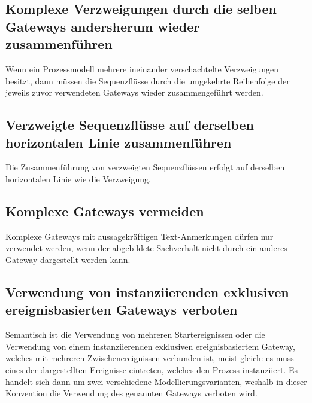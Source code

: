 \documentclass[12pt,report]{snetTeaching}
\begin{document}
\subsection{Komplexe Verzweigungen durch die selben Gateways andersherum wieder zusammenführen}
\label{sec:gwGleichSchliessen}

Wenn ein Prozessmodell mehrere ineinander verschachtelte Verzweigungen besitzt, dann müssen die Sequenzflüsse durch die umgekehrte Reihenfolge der jeweils zuvor verwendeten Gateways wieder zusammengeführt werden.


\begin{Rahmen}
	\hfill
\end{Rahmen}


\clearpage
\subsection{Verzweigte Sequenzflüsse auf derselben horizontalen Linie zusammenführen}

Die Zusammenführung von verzweigten Sequenzflüssen erfolgt auf derselben horizontalen Linie wie die Verzweigung.


\begin{Rahmen}
	\hfill
\end{Rahmen}



\subsection{Komplexe Gateways vermeiden}

Komplexe Gateways mit aussagekräftigen Text-Anmerkungen dürfen nur verwendet werden, wenn der abgebildete Sachverhalt nicht durch ein anderes Gateway dargestellt werden kann.

\begin{Rahmen}
	\hfill
\end{Rahmen}


\clearpage
\subsection{Verwendung von instanziierenden exklusiven ereignisbasierten Gateways verboten}

Semantisch ist die Verwendung von mehreren Startereignissen oder die Verwendung von einem instanziierenden exklusiven ereignisbasiertem Gateway, welches mit mehreren Zwischenereignissen verbunden ist, meist gleich: es muss eines der dargestellten Ereignisse eintreten, welches den Prozess instanziiert. Es handelt sich dann um zwei verschiedene Modellierungsvarianten, weshalb in dieser Konvention die Verwendung des genannten Gateways verboten wird.
\end{document}
